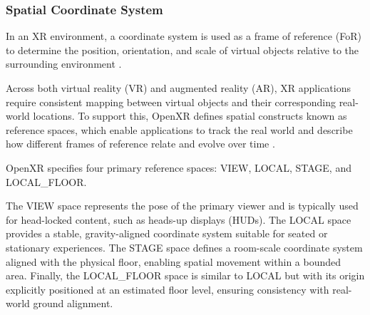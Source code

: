 \subsubsection{Spatial Coordinate System}

In an XR environment, a coordinate system is used as a frame of reference (FoR) to determine the position, orientation, and scale of virtual objects relative to the surrounding environment \parencite{davari_towards_2024}.

Across both virtual reality (VR) and augmented reality (AR), XR applications require consistent mapping between virtual objects and their corresponding real-world locations. To support this, OpenXR defines spatial constructs known as reference spaces, which enable applications to track the real world and describe how different frames of reference relate and evolve over time \parencite{openxr2024spec}.

OpenXR specifies four primary reference spaces: VIEW, LOCAL, STAGE, and LOCAL\_FLOOR.

The VIEW space represents the pose of the primary viewer and is typically used for head-locked content, such as heads-up displays (HUDs). The LOCAL space provides a stable, gravity-aligned coordinate system suitable for seated or stationary experiences. The STAGE space defines a room-scale coordinate system aligned with the physical floor, enabling spatial movement within a bounded area. Finally, the LOCAL\_FLOOR space is similar to LOCAL but with its origin explicitly positioned at an estimated floor level, ensuring consistency with real-world ground alignment.


